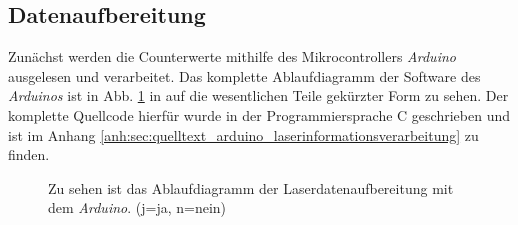 \subsection{Datenaufbereitung}\label{subsec:datenaufbereitung}
Zunächst werden die Counterwerte mithilfe des Mikrocontrollers \textit{Arduino}
ausgelesen und verarbeitet. Das komplette Ablaufdiagramm der Software des
\textit{Arduinos} ist in Abb. \ref{fig:ablaufdiagramm_arduino_laser} in auf die
wesentlichen Teile gekürzter Form zu sehen. Der komplette Quellcode hierfür
wurde in der Programmiersprache C geschrieben und ist im Anhang
\ref{anh:sec:quelltext_arduino_laserinformationsverarbeitung} zu finden.
\begin{figure}[hp]
 	\centering
	\caption[Laserdatenaufbereitung -
	Ablaufdiagramm]{Zu sehen ist das Ablaufdiagramm der
	Laserdatenaufbereitung mit dem
	\textit{Arduino}. (j=ja, n=nein)}\label{fig:ablaufdiagramm_arduino_laser}
\end{figure}
